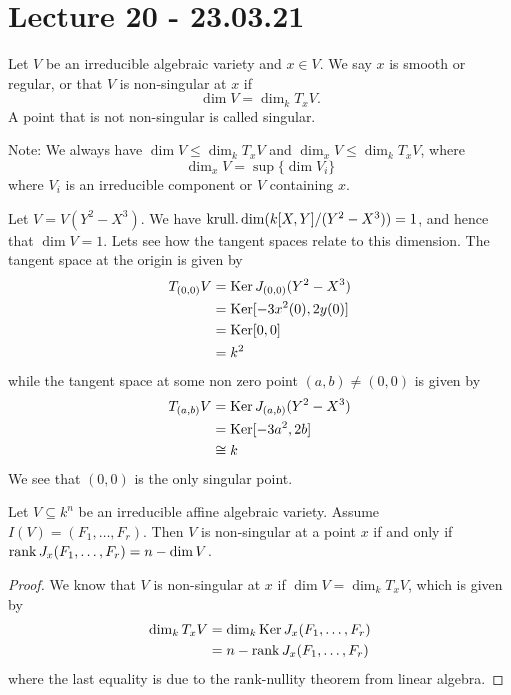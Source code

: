 


\section{Lecture 20 - 23.03.21}

\begin{definition}
Let $V$ be an irreducible algebraic variety and $x\in V$. We say $x$ is smooth or regular, or that $V$ is non-singular at $x$ if 
\begin{equation*}
    \dim V = \dim_k T_x V.
\end{equation*}
A point that is not non-singular is called singular. 
\end{definition}

Note: We always have $\dim V \leq \dim_k T_x V$ and $\dim_x V \leq \dim_k T_x V$, where
\begin{equation*}
    \dim_x V = \sup\{\dim V_i\}
\end{equation*}
where $V_i$ is an irreducible component or $V$ containing $x$. 

\begin{example}
Let $V = V(Y^2-X^3)$. We have $\operatorname{krull.dim}(k[X, Y]/(Y^2-X^3))=1$, and hence that $\dim V = 1$. Lets see how the tangent spaces relate to this dimension. The tangent space at the origin is given by
\begin{align*}
    T_{(0,0)} V 
    &= \operatorname{Ker} J_{(0,0)}(Y^2-X^3) \\
    &= \operatorname{Ker} [-3x^2 (0), 2y(0)] \\
    &= \operatorname{Ker} [0,0] \\
    &= k^2
\end{align*}
while the tangent space at some non zero point $(a, b)\neq (0,0)$ is given by
\begin{align*}
    T_{(a, b)} V
    &= \operatorname{Ker} J_{(a, b)}(Y^2 - X^3) \\
    &= \operatorname{Ker} [-3a^2, 2b] \\
    &\cong k
\end{align*}
We see that $(0,0)$ is the only singular point. 
\end{example}


\begin{theorem}
Let $V\subseteq k^n$ be an irreducible affine algebraic variety. Assume $I(V)=(F_1, \ldots, F_r)$. Then $V$ is non-singular at a point $x$ if and only if $\operatorname{rank} J_x(F_1, \ldots, F_r) = n-\dim V$. 
\end{theorem}
\begin{proof}
We know that $V$ is non-singular at $x$ if $\dim V = \dim_k T_x V$, which is given by 
\begin{align*}
    \dim_k T_x V 
    &= \dim_k\operatorname{Ker} J_x(F_1, \ldots, F_r) \\
    &= n-\operatorname{rank} J_x(F_1, \ldots, F_r)
\end{align*}
where the last equality is due to the rank-nullity theorem from linear algebra. 
\end{proof}

